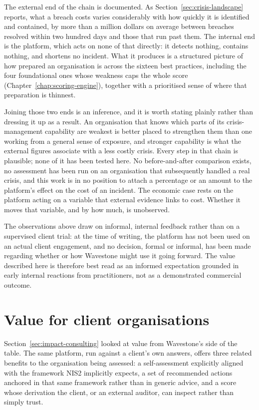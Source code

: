 The external end of the chain is documented. As Section~\ref{sec:crisis-landscape} reports, what a breach costs varies considerably with how quickly it is identified and contained, by more than a million dollars on average between breaches resolved within two hundred days and those that run past them. The internal end is the platform, which acts on none of that directly: it detects nothing, contains nothing, and shortens no incident. What it produces is a structured picture of how prepared an organisation is across the sixteen best practices, including the four foundational ones whose weakness caps the whole score (Chapter~\ref{chap:scoring-engine}), together with a prioritised sense of where that preparation is thinnest.

Joining those two ends is an inference, and it is worth stating plainly rather than dressing it up as a result. An organisation that knows which parts of its crisis-management capability are weakest is better placed to strengthen them than one working from a general sense of exposure, and stronger capability is what the external figures associate with a less costly crisis. Every step in that chain is plausible; none of it has been tested here. No before-and-after comparison exists, no assessment has been run on an organisation that subsequently handled a real crisis, and this work is in no position to attach a percentage or an amount to the platform's effect on the cost of an incident. The economic case rests on the platform acting on a variable that external evidence links to cost. Whether it moves that variable, and by how much, is unobserved.

The observations above draw on informal, internal feedback rather than on a supervised client trial: at the time of writing, the platform has not been used on an actual client engagement, and no decision, formal or informal, has been made regarding whether or how Wavestone might use it going forward. The value described here is therefore best read as an informed expectation grounded in early internal reactions from practitioners, not as a demonstrated commercial outcome.

\section{Value for client organisations}
\label{sec:impact-clients}

Section~\ref{sec:impact-consulting} looked at value from Wavestone's side of the table. The same platform, run against a client's own answers, offers three related benefits to the organisation being assessed: a self-assessment explicitly aligned with the framework NIS2 implicitly expects, a set of recommended actions anchored in that same framework rather than in generic advice, and a score whose derivation the client, or an external auditor, can inspect rather than simply trust.

